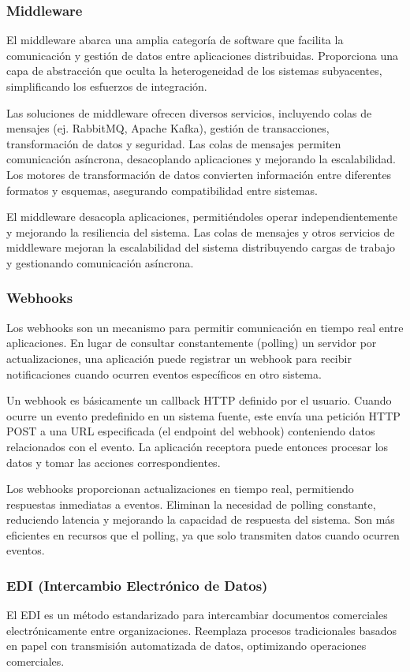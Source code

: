 \documentclass[12pt]{book}
\begin{document}
\subsubsection{Middleware}
El middleware abarca una amplia categoría de software que facilita la comunicación y gestión de datos entre aplicaciones distribuidas. Proporciona una capa de abstracción que oculta la heterogeneidad de los sistemas subyacentes, simplificando los esfuerzos de integración.

Las soluciones de middleware ofrecen diversos servicios, incluyendo colas de mensajes (ej. RabbitMQ, Apache Kafka), gestión de transacciones, transformación de datos y seguridad. Las colas de mensajes permiten comunicación asíncrona, desacoplando aplicaciones y mejorando la escalabilidad. Los motores de transformación de datos convierten información entre diferentes formatos y esquemas, asegurando compatibilidad entre sistemas.

El middleware desacopla aplicaciones, permitiéndoles operar independientemente y mejorando la resiliencia del sistema. Las colas de mensajes y otros servicios de middleware mejoran la escalabilidad del sistema distribuyendo cargas de trabajo y gestionando comunicación asíncrona.

\subsubsection{Webhooks}
Los webhooks son un mecanismo para permitir comunicación en tiempo real entre aplicaciones. En lugar de consultar constantemente (polling) un servidor por actualizaciones, una aplicación puede registrar un webhook para recibir notificaciones cuando ocurren eventos específicos en otro sistema.

Un webhook es básicamente un callback HTTP definido por el usuario. Cuando ocurre un evento predefinido en un sistema fuente, este envía una petición HTTP POST a una URL especificada (el endpoint del webhook) conteniendo datos relacionados con el evento. La aplicación receptora puede entonces procesar los datos y tomar las acciones correspondientes.

Los webhooks proporcionan actualizaciones en tiempo real, permitiendo respuestas inmediatas a eventos. Eliminan la necesidad de polling constante, reduciendo latencia y mejorando la capacidad de respuesta del sistema. Son más eficientes en recursos que el polling, ya que solo transmiten datos cuando ocurren eventos.

\subsubsection{EDI (Intercambio Electrónico de Datos)}
El EDI es un método estandarizado para intercambiar documentos comerciales electrónicamente entre organizaciones. Reemplaza procesos tradicionales basados en papel con transmisión automatizada de datos, optimizando operaciones comerciales.
\end{document}

